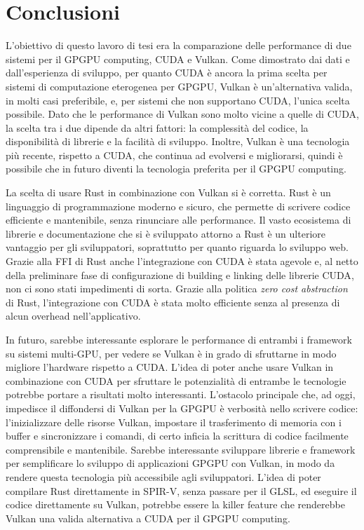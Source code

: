\chapter{Conclusioni}
\label{sec:conclusion}

L'obiettivo di questo lavoro di tesi era la comparazione delle performance di due sistemi per il \gls{GPGPU} computing, \gls{CUDA} e Vulkan. Come dimostrato dai dati e dall'esperienza di sviluppo, per quanto \gls{CUDA} è ancora la prima scelta per sistemi di computazione eterogenea per \gls{GPGPU}, Vulkan è un'alternativa valida, in molti casi preferibile, e, per sistemi che non supportano \gls{CUDA}, l'unica scelta possibile. Dato che le performance di Vulkan sono molto vicine a quelle di \gls{CUDA}, la scelta tra i due dipende da altri fattori: la complessità del codice, la disponibilità di librerie e la facilità di sviluppo. Inoltre, Vulkan è una tecnologia più recente, rispetto a \gls{CUDA}, che continua ad evolversi e migliorarsi, quindi è possibile che in futuro diventi la tecnologia preferita per il \gls{GPGPU} computing.

La scelta di usare Rust in combinazione con Vulkan si è corretta. Rust è un linguaggio di programmazione moderno e sicuro, che permette di scrivere codice efficiente e mantenibile, senza rinunciare alle performance. Il vasto ecosistema di librerie e documentazione che si è sviluppato attorno a Rust è un ulteriore vantaggio per gli sviluppatori, soprattutto per quanto riguarda lo sviluppo web. Grazie alla \gls{FFI} di Rust anche l'integrazione con \gls{CUDA} è stata agevole e, al netto della preliminare fase di configurazione di building e linking delle librerie \gls{CUDA}, non ci sono stati impedimenti di sorta. Grazie alla politica \textit{zero cost abstraction} di Rust, l'integrazione con \gls{CUDA} è stata molto efficiente senza al presenza di alcun overhead nell'applicativo.

In futuro, sarebbe interessante esplorare le performance di entrambi i framework su sistemi multi-GPU, per vedere se Vulkan è in grado di sfruttarne in modo migliore l'hardware rispetto a \gls{CUDA}. L'idea di poter anche usare Vulkan in combinazione con \gls{CUDA} per sfruttare le potenzialità di entrambe le tecnologie potrebbe portare a risultati molto interessanti.
L'ostacolo principale che, ad oggi, impedisce il diffondersi di Vulkan per la \gls{GPGPU} è verbosità nello scrivere codice: l'inizializzare delle risorse Vulkan, impostare il trasferimento di memoria con i buffer e sincronizzare i comandi, di certo inficia la scrittura di codice facilmente comprensibile e mantenibile. Sarebbe interessante sviluppare librerie e framework per semplificare lo sviluppo di applicazioni \gls{GPGPU} con Vulkan, in modo da rendere questa tecnologia più accessibile agli sviluppatori. L'idea di poter compilare Rust direttamente in \gls{SPIR-V}, senza passare per il \gls{GLSL}, ed eseguire il codice direttamente su Vulkan, potrebbe essere la killer feature che renderebbe Vulkan una valida alternativa a \gls{CUDA} per il \gls{GPGPU} computing.
